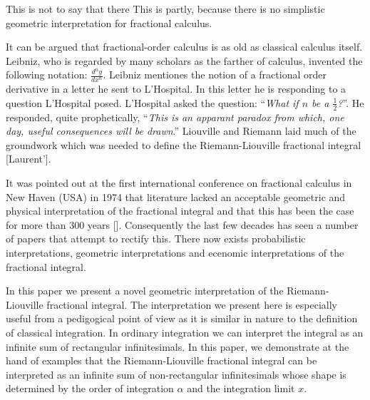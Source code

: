 \documentclass{article}
\theoremstyle{theorem}
\theoremstyle{definition}
\begin{document}
This is not to say that there  This is partly, because there is no simplistic geometric interpretation for fractional calculus.  

It can be argued that fractional-order calculus is as old as classical calculus itself. Leibniz, who is regarded by many scholars as the farther of calculus, invented the following notation: $\frac{d^n y}{d x^n}$. Leibniz mentiones the notion of a fractional 
order derivative in a letter he sent to L'Hospital. In this letter he is responding to a question L'Hospital posed. L'Hospital asked the question: ``\emph{What if $n$ be a $\frac{1}{2}$?}''. He responded, quite prophetically, ``\emph{This is an apparant paradox from which, one day, useful 
consequences will be drawn}.'' Liouville and Riemann laid much of the groundwork which was needed to define the Riemann-Liouville fractional integral [Laurent’]. 

It was pointed out at the first international conference on fractional calculus in New Haven (USA) in 1974 that literature lacked an acceptable geometric and physical
interpretation of the fractional integral and that this has been the case for more than 300 years []. Consequently the last few decades has seen a number of papers that attempt to rectify this. There now exists probabilistic interpretations, 
geometric interpretations and ecenomic interpretations of the fractional integral. 

In this paper we present a novel geometric interpretation of the Riemann-Liouville fractional integral. The interpretation we present here is especially useful from 
a pedigogical point of view as it is similar in nature to the definition of classical integration. In ordinary integration we can interpret the integral 
as an infinite sum of rectangular infinitesimals. In this paper, we demonstrate at the hand of examples that the Riemann-Liouville fractional integral can be interpreted 
as an infinite sum of non-rectangular infinitesimals whose shape is determined by the order of integration $\alpha$ and the integration limit $x$.   
\end{document}
